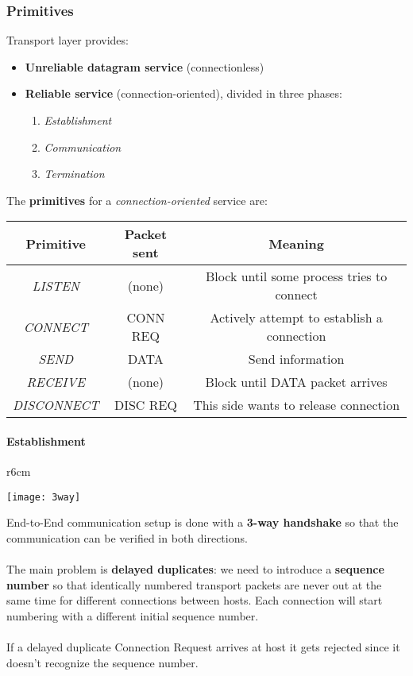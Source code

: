\subsubsection{Primitives}
Transport layer provides:
\begin{itemize}
	\item \textbf{Unreliable datagram service} (connectionless)
	\item \textbf{\textbf{Reliable service}} (connection-oriented), divided in three phases:
	\begin{enumerate}
		\item \textit{Establishment}
		\item \textit{Communication}
		\item \textit{Termination}
	\end{enumerate}
\end{itemize}
\newpage \noindent The \textbf{primitives} for a \textit{connection-oriented} service are:
\begin{table}[!h]
	\centering
	\begin{tabular}{|c|c|c|}
		\hline
		\textbf{Primitive} & \textbf{Packet sent} & \textbf{Meaning} \\
		\hline
		\textit{LISTEN} & (none) & Block until some process tries to connect \\
		\hline
		\textit{CONNECT} & CONN REQ & Actively attempt to establish a connection \\
		\hline
		\textit{SEND} & DATA & Send information \\
		\hline
		\textit{RECEIVE} & (none) & Block until DATA packet arrives \\
		\hline
		\textit{DISCONNECT} & DISC REQ & This side wants to release connection \\
		\hline
	\end{tabular}
\end{table}

\paragraph{Establishment}
\begin{wrapfigure}[10]{r}{6cm}
	\vspace{-1cm}
	\begin{center}
		\texttt{[image: 3way]}
	\end{center}
\end{wrapfigure}
End-to-End communication setup is done with a \textbf{3-way handshake} so that the communication can be verified in both directions. \\\\
The main problem is \textbf{delayed duplicates}: we need to introduce a \textbf{sequence number} so that identically numbered transport packets are never out at the same time for different connections between hosts. Each connection will start numbering with a different initial sequence number.\\\\
If a delayed duplicate Connection Request arrives at host it gets rejected since it doesn't recognize the sequence number.

